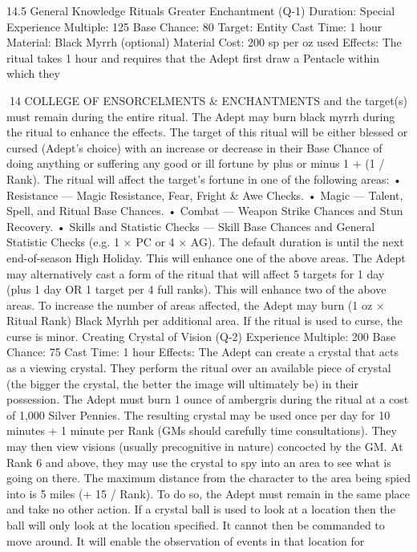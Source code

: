 \documentclass[a4paper]{article}
\begin{document}
\begin{multicols}{3}
14.5 General Knowledge Rituals
Greater Enchantment (Q-1)
Duration: Special
Experience Multiple: 125
Base Chance: 80%
Target: Entity
Cast Time: 1 hour
Material: Black Myrrh (optional)
Material Cost: 200 sp per oz used
Effects: The ritual takes 1 hour and requires that
the Adept first draw a Pentacle within which they

14 COLLEGE OF ENSORCELMENTS & ENCHANTMENTS
and the target(s) must remain during the entire
ritual. The Adept may burn black myrrh during the
ritual to enhance the effects. The target of this
ritual will be either blessed or cursed (Adept’s
choice) with an increase or decrease in their Base
Chance of doing anything or suffering any good or
ill fortune by plus or minus 1 + (1 / Rank).
The ritual will affect the target’s fortune in one of
the following areas:
• Resistance — Magic Resistance, Fear, Fright &
Awe Checks.
• Magic — Talent, Spell, and Ritual Base Chances.
• Combat — Weapon Strike Chances and Stun
Recovery.
• Skills and Statistic Checks — Skill Base Chances
and General Statistic Checks (e.g. 1 × PC or 4 ×
AG).
The default duration is until the next end-of-season
High Holiday. This will enhance one of the above
areas.
The Adept may alternatively cast a form of the
ritual that will affect 5 targets for 1 day (plus 1 day
OR 1 target per 4 full ranks). This will enhance
two of the above areas.
To increase the number of areas affected, the
Adept may burn (1 oz × Ritual Rank) Black Myrhh
per additional area.
If the ritual is used to curse, the curse is minor.
Creating Crystal of Vision (Q-2)
Experience Multiple: 200
Base Chance: 75%
Cast Time: 1 hour
Effects: The Adept can create a crystal that acts as
a viewing crystal. They perform the ritual over an
available piece of crystal (the bigger the crystal,
the better the image will ultimately be) in their
possession. The Adept must burn 1 ounce of ambergris during the ritual at a cost of 1,000 Silver
Pennies. The resulting crystal may be used once
per day for 10 minutes + 1 minute per Rank (GMs
should carefully time consultations).
They may then view visions (usually precognitive
in nature) concocted by the GM. At Rank 6 and
above, they may use the crystal to spy into an area
to see what is going on there. The maximum distance from the character to the area being spied
into is 5 miles (+ 15 / Rank). To do so, the Adept
must remain in the same place and take no other
action.
If a crystal ball is used to look at a location then the
ball will only look at the location specified. It
cannot then be commanded to move around. It will
enable the observation of events in that location for

\end{multicols}
\end{document}
